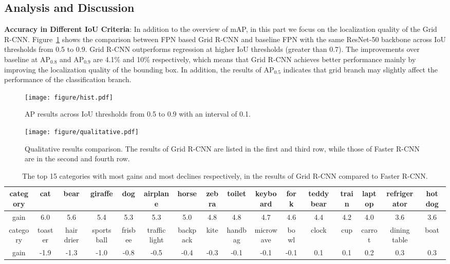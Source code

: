 \documentclass[10pt,twocolumn,letterpaper]{article}
\begin{document}
\subsection{Analysis and Discussion}

\textbf{Accuracy in Different IoU Criteria}: In addition to the overview of mAP, in this part we focus on the localization quality of the Grid R-CNN.
Figure~\ref{Fig.hist} shows the comparison between FPN based Grid R-CNN and baseline FPN with the same ResNet-50 backbone across IoU thresholds from 0.5 to 0.9. Grid R-CNN outperforms regression at higher IoU thresholds (greater than 0.7). The improvements over baseline at AP$_{0.8}$ and AP$_{0.9}$ are 4.1\% and 10\% respectively, which means that Grid R-CNN achieves better performance mainly by improving the localization quality of the bounding box. In addition, the results of AP$_{0.5}$ indicates that grid branch may slightly affect the performance of the classification branch.


\begin{figure}[h] 
\centering 
\texttt{[image: figure/hist.pdf]}
\caption{AP results across IoU thresholds from 0.5 to 0.9 with an interval of 0.1.} 
\label{Fig.hist} 
\end{figure}

\begin{figure*}[t]
\centering
\label{qualitative}
\texttt{[image: figure/qualitative.pdf]}
\caption{Qualitative results comparison. The results of Grid R-CNN are listed in the first and third row, while those of Faster R-CNN are in the second and fourth row. }
\label{fig:qualitative}
\end{figure*}

\begin{table*}[ht]
\setlength{\tabcolsep}{0.5mm}
\footnotesize
\begin{center}
\begin{tabular}{ | c | c | c | c  | c | c | c | c | c | c | c  |c | c | c | c | c  |  }
\hline
category & cat & bear & giraffe & dog & airplane & horse & zebra & toilet & keyboard & fork & teddy bear & train & laptop & refrigerator & hot dog\\
\hline
gain & 6.0 & 5.6 & 5.4 & 5.3 & 5.3 & 5.0 & 4.8 & 4.8 & 4.7 &  4.6 & 4.4 & 4.2 & 4.0 & 3.6 & 3.6\\
\hline
category & toaster & hair drier & sports ball & frisbee& traffic light & backpack & kite & handbag & microwave & bowl & clock & cup & carrot & dining table & boat\\
\hline
gain & -1.9& -1.3 & -1.0 & -0.8 & -0.5 & -0.4 & -0.3 & -0.1 & -0.1 & -0.1 & 0.1 & 0.1 & 0.2 & 0.3 & 0.3 \\
\hline
\end{tabular}
\vspace{1mm}
\caption{The top 15 categories with most gains and most declines respectively, in the results of Grid R-CNN compared to Faster R-CNN.}
\label{tab:top10}
\end{center}
\end{table*}
\end{document}
